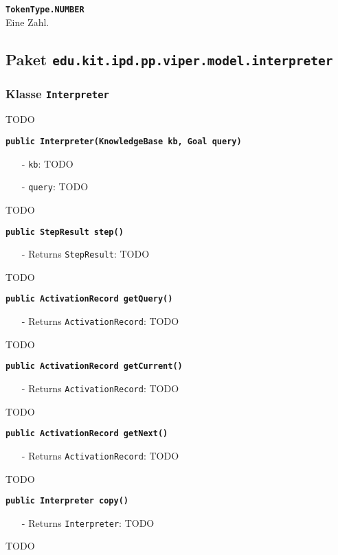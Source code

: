 \documentclass[parskip=full,11pt,twoside]{scrartcl}
\begin{document}
\textbf{\texttt{TokenType.NUMBER}}\\
Eine Zahl.

\newpage
\subsection{Paket \texttt{edu.kit.ipd.pp.viper.model.interpreter}}

\subsubsection{Klasse \texttt{Interpreter}}
TODO

\textbf{\texttt{public Interpreter(KnowledgeBase kb, Goal query)}}
\begin{itemize}[noitemsep]
	\item[-] \texttt{kb}: TODO
	\item[-] \texttt{query}: TODO
\end{itemize}
TODO

\textbf{\texttt{public StepResult step()}}
\begin{itemize}[noitemsep]
	\item[-] Returns \texttt{StepResult}: TODO
\end{itemize}
TODO

\textbf{\texttt{public ActivationRecord getQuery()}}
\begin{itemize}[noitemsep]
	\item[-] Returns \texttt{ActivationRecord}: TODO
\end{itemize}
TODO

\textbf{\texttt{public ActivationRecord getCurrent()}}
\begin{itemize}[noitemsep]
	\item[-] Returns \texttt{ActivationRecord}: TODO
\end{itemize}
TODO

\textbf{\texttt{public ActivationRecord getNext()}}
\begin{itemize}[noitemsep]
	\item[-] Returns \texttt{ActivationRecord}: TODO
\end{itemize}
TODO

\textbf{\texttt{public Interpreter copy()}}
\begin{itemize}[noitemsep]
	\item[-] Returns \texttt{Interpreter}: TODO
\end{itemize}
TODO
\end{document}
